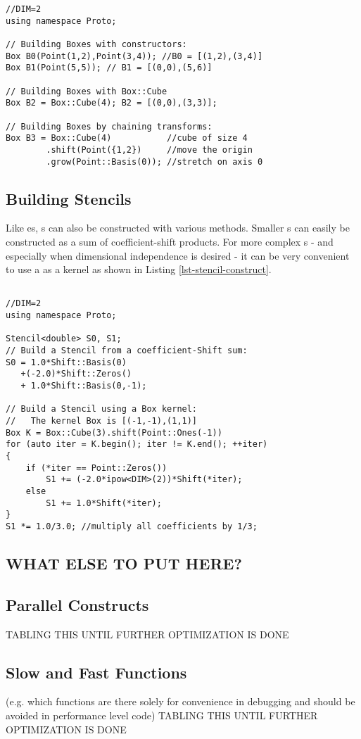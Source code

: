 \documentclass[12pt,a4paper]{article}
\begin{document}
\begin{lstlisting}[caption=Box Construction Idiom, label=lst-box-construct]
//DIM=2
using namespace Proto;

// Building Boxes with constructors:
Box B0(Point(1,2),Point(3,4)); //B0 = [(1,2),(3,4)]
Box B1(Point(5,5)); // B1 = [(0,0),(5,6)]

// Building Boxes with Box::Cube
Box B2 = Box::Cube(4); B2 = [(0,0),(3,3)];

// Building Boxes by chaining transforms:
Box B3 = Box::Cube(4)			//cube of size 4
		.shift(Point({1,2})     //move the origin
		.grow(Point::Basis(0));	//stretch on axis 0

\end{lstlisting}

\subsection{Building Stencils}

Like es, s can also be constructed with various methods. Smaller s can easily be constructed as a sum of coefficient-shift products. For more complex s - and especially when dimensional independence is desired - it can be very convenient to use a  as a kernel as shown in Listing \ref{lst-stencil-construct}. 

\begin{lstlisting}[label=lst-stencil-construct, caption=Stencil Construction Methods]

//DIM=2
using namespace Proto;

Stencil<double> S0, S1;
// Build a Stencil from a coefficient-Shift sum:
S0 = 1.0*Shift::Basis(0)
   +(-2.0)*Shift::Zeros()
   + 1.0*Shift::Basis(0,-1);
   
// Build a Stencil using a Box kernel:
//   The kernel Box is [(-1,-1),(1,1)]
Box K = Box::Cube(3).shift(Point::Ones(-1)) 
for (auto iter = K.begin(); iter != K.end(); ++iter)
{
	if (*iter == Point::Zeros())
		S1 += (-2.0*ipow<DIM>(2))*Shift(*iter);
	else
		S1 += 1.0*Shift(*iter);
}
S1 *= 1.0/3.0; //multiply all coefficients by 1/3;

\end{lstlisting}

\subsection{WHAT ELSE TO PUT HERE?}

\subsection{Parallel Constructs}
TABLING THIS UNTIL FURTHER OPTIMIZATION IS DONE

\subsection{Slow and Fast Functions}
(e.g. which functions are there solely for convenience in debugging and should be avoided in performance level code)
TABLING THIS UNTIL FURTHER OPTIMIZATION IS DONE
\end{document}
